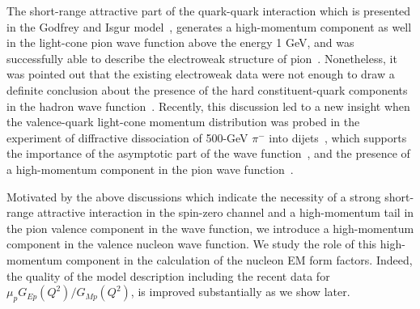 \documentclass[preprint,aps,showpacs,floatfix]{revtex4}
\begin{document}
The short-range attractive part of the quark-quark interaction
which is presented in the Godfrey and Isgur model~\cite{god85}, 
generates a high-momentum component as well in the light-cone pion wave
function above the energy 1 GeV, and was successfully able to describe the
electroweak structure of pion~\cite{card}. Nonetheless, it was
pointed out that the existing electroweak data were not enough to
draw a definite conclusion about the presence of the 
hard constituent-quark components in the hadron wave function~\cite{ji}.
Recently, this discussion led to a new insight when the 
valence-quark light-cone momentum distribution was probed in the
experiment of diffractive dissociation of 500-GeV $\pi^-$ into
dijets~\cite{ashery}, which supports the importance of the
asymptotic part of the wave function~\cite{pqcd2}, 
and the presence of a high-momentum component in the pion wave 
function~\cite{tob01}.

Motivated by the above discussions which indicate the
necessity of a strong short-range attractive interaction in the
spin-zero channel and a high-momentum tail in the pion valence
component in the wave function, we introduce a high-momentum component in the
valence nucleon wave function. 
We study the role of this high-momentum component in the calculation of 
the nucleon EM form factors. 
Indeed, the quality of the model description including the recent data for 
$\mu_p G_{Ep}(Q^2)/G_{Mp}(Q^2)$, is improved substantially as we show later.
\end{document}

